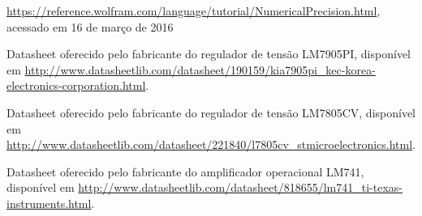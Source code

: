 \documentclass[a4paper]{instrumentacao}
\begin{document}
\newpage
\begin{thebibliography}{9}
 \url{https://reference.wolfram.com/language/tutorial/NumericalPrecision.html}, acessado em 16 de março de 2016

 Datasheet oferecido pelo fabricante do regulador de tensão LM7905PI, disponível em \url{http://www.datasheetlib.com/datasheet/190159/kia7905pi_kec-korea-electronics-corporation.html}.

 Datasheet oferecido pelo fabricante do regulador de tensão LM7805CV, disponível em \url{http://www.datasheetlib.com/datasheet/221840/l7805cv_stmicroelectronics.html}.

 Datasheet oferecido pelo fabricante do amplificador operacional LM741, disponível em \url{http://www.datasheetlib.com/datasheet/818655/lm741_ti-texas-instruments.html}.



\end{thebibliography}
\end{document}
